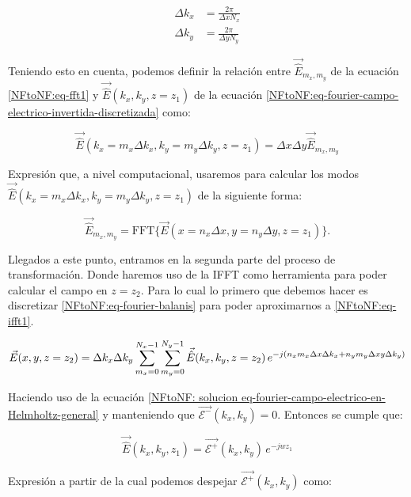 \documentclass{article}
\begin{document}
\begin{align}
\Delta k_{x}&=\frac{2\pi}{\Delta x N_{x}}
\\
\Delta k_{y}&=\frac{2\pi}{\Delta y N_{y}}
\end{align}

Teniendo esto en cuenta, podemos definir la relación entre 
$\vec{\hat{E}}_{m_{x},m_{y}}$ de la ecuación \eqref{NFtoNF:eq-fft1} y 
$\vec{\hat{E}}(k_{x},k_{y},z=z_{1})$ de la ecuación \eqref{NFtoNF:eq-fourier-campo-electrico-invertida-discretizada} como:

\begin{equation}
\vec{\hat{E}}(k_{x}=m_{x} \Delta k_{x},k_{y}=m_{y} \Delta
k_{y},z=z_{1})= \Delta x \Delta y\vec{\hat{E}}_{m_{x},m_{y}}
\end{equation}

Expresión que, a nivel computacional, usaremos para calcular los modos $\vec{\hat{E}}(k_{x}=m_{x} \Delta k_{x},k_{y}=m_{y} \Delta
k_{y},z=z_{1})$ de la siguiente forma:

\begin{equation}
\vec{\hat{E}}_{m_{x},m_{y}}=\mbox{FFT}\{\vec{E}(x=n_{x}\Delta
x,y=n_{y} \Delta y,z=z_{1})\}.
\end{equation}

Llegados a este punto, entramos en la segunda parte del proceso de transformación. Donde haremos uso de la IFFT como herramienta para poder calcular el campo en $z=z_2$. Para lo cual lo primero que debemos hacer es discretizar \eqref{NFtoNF:eq-fourier-balanis} para poder aproximarnos a \eqref{NFtoNF:eq-ifft1}.

\begin{equation}
\vec{E}(x,y,z=z_{2}) =
\\
\Delta k_{x} \Delta k_{y}
\sum_{m_{x}=0}^{N_{x}-1}\sum_{m_{y}=0}^{N_{y}-1} 
\vec{\hat{E}}(k_{x},k_{y},z=z_{2})
\,e^{-j(n_{x}m_{x}\Delta x  \Delta k_{x} + n_{y}m_{y}\Delta xy  \Delta k_{y})}
\end{equation}

Haciendo uso de la ecuación \eqref{NFtoNF: solucion eq-fourier-campo-electrico-en-Helmholtz-general} y manteniendo que $\vec{\mathcal{E}^{-}}(k_{x},k_{y})=0$. Entonces se cumple que:

\begin{equation}
\vec{\hat{E}}(k_{x},k_{y},z_{1})=\vec{\mathcal{E}^{+}}(k_{x},k_{y})\,e^{-j
w z_{1}}
\end{equation}

Expresión a partir de la cual podemos despejar $\vec{\mathcal{E}^{+}}(k_{x},k_{y})$ como:
\end{document}

